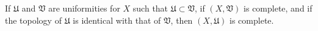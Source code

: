 If $\mathfrak{U}$ and $\mathfrak{V}$ are uniformities for $X$ such that $\mathfrak{U} \subset \mathfrak{V}$, if $(X, \mathfrak{V})$ is complete, and if the topology of $\mathfrak{U}$ is identical with that of $\mathfrak{V}$, then $(X, \mathfrak{U})$ is complete.
